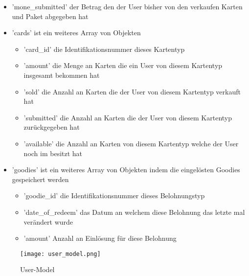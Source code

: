 \begin{itemize}
\begin{itemize}
						\item 'mone\_submitted' der Betrag den der User bisher von den verkaufen Karten und Paket abgegeben hat
						\item 'cards' ist ein weiteres Array von Objekten
						\begin{itemize}
							\item 'card\_id' die Identifikationsnummer dieses Kartentyp
							\item 'amount' die Menge an Karten die ein User von diesem Kartentyp insgesamt bekommen hat
							\item 'sold' die Anzahl an Karten die der User von diesem Kartentyp verkauft hat
							\item 'submitted' die Anzahl an Karten die der User von diesem Kartentyp zurückgegeben hat
							\item 'available' die Anzahl an Karten von diesem Kartentyp welche der User noch im besitzt hat
						\end{itemize}
						\item 'goodies' ist ein weiteres Array von Objekten indem die eingelösten Goodies gespeichert werden
						\begin{itemize}
							\item 'goodie\_id' die Identifikationsnummer dieses Belohnungstyp
							\item 'date\_of\_redeem' das Datum an welchem diese Belohnung das letzte mal verändert wurde
							\item 'amount' Anzahl an Einlösung für diese Belohnung
						\end{itemize}
					\end{itemize}
				\end{itemize}

			\begin{figure}[h]
				\centering
				\texttt{[image: user\_model.png]}
				\caption{User-Model}
			\end{figure}
		
		\newpage
